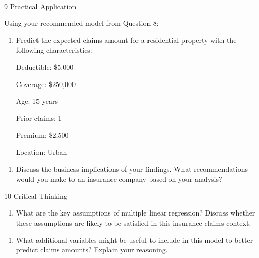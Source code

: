 \documentclass[8pt, twocolumn]{extarticle}
\providecommand{\tightlist}{%
      \setlength{\itemsep}{0pt}\setlength{\parskip}{0pt}}
\begin{document}
    \begin{center}
    \end{center}
    { \hspace*{\fill} \\}
    
    9 Practical Application

Using your recommended model from Question 8:

    \begin{enumerate}
\def\labelenumi{(\alph{enumi})}
\tightlist
\item
  Predict the expected claims amount for a residential property with the
  following characteristics:

  Deductible: \$5,000

  Coverage: \$250,000

  Age: 15 years

  Prior claims: 1

  Premium: \$2,500

  Location: Urban
\end{enumerate}

    \begin{enumerate}
\def\labelenumi{(\alph{enumi})}
\setcounter{enumi}{1}
\tightlist
\item
  Discuss the business implications of your findings. What
  recommendations would you make to an insurance company based on your
  analysis?
\end{enumerate}

    10 Critical Thinking

    \begin{enumerate}
\def\labelenumi{(\alph{enumi})}
\tightlist
\item
  What are the key assumptions of multiple linear regression? Discuss
  whether these assumptions are likely to be satisfied in this insurance
  claims context.
\end{enumerate}

    \begin{enumerate}
\def\labelenumi{(\alph{enumi})}
\setcounter{enumi}{1}
\tightlist
\item
  What additional variables might be useful to include in this model to
  better predict claims amounts? Explain your reasoning.
\end{enumerate}


    
    
    
\end{document}
